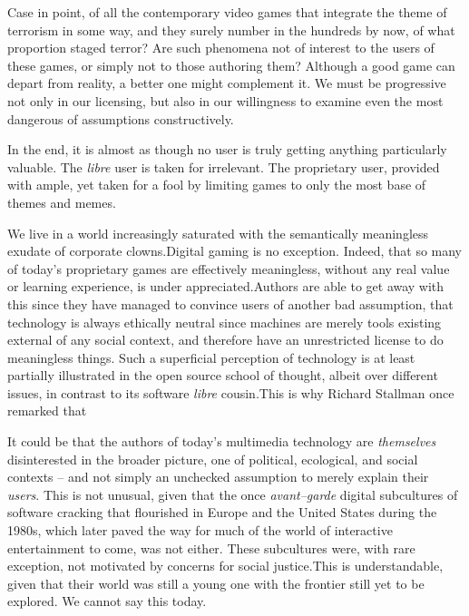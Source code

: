 Case in point, of all the contemporary video games that integrate the theme of terrorism in some way, and they surely number in the hundreds by now, of what proportion staged terror? Are such phenomena not of interest to the users of these games, or simply not to those authoring them? Although a good game can depart from reality, a better one might complement it. We must be progressive not only in our licensing, but also in our willingness to examine even the most dangerous of assumptions constructively. 

In the end, it is almost as though no user is truly getting anything particularly valuable. The {\it libre} user is taken for irrelevant. The proprietary user, provided with ample, yet taken for a fool by limiting games to only the most base of themes and memes.

We live in a world increasingly saturated with the semantically meaningless exudate of corporate clowns. Digital gaming is no exception. Indeed, that so many of today's proprietary games are effectively meaningless, without any real value or learning experience, is under appreciated. Authors are able to get away with this since they have managed to convince users of another bad assumption, that technology is always ethically neutral since machines are merely tools existing external of any social context, and therefore have an unrestricted license to do meaningless things. Such a superficial perception of technology is at least partially illustrated in the open source school of thought, albeit over different issues, in contrast to its software {\it libre} cousin. This is why Richard Stallman once remarked that \footnotecite[auza2008] 

It could be that the authors of today's multimedia technology are {\it themselves} disinterested in the broader picture, one of political, ecological, and social contexts -- and not simply an unchecked assumption to merely explain their {\it users}. This is not unusual, given that the once {\it avant--garde} digital subcultures of software cracking that flourished in Europe and the United States during the 1980s, which later paved the way for much of the world of interactive entertainment to come, was not either. These subcultures were, with rare exception, not motivated by concerns for social justice.\footnotecite[extras={, p.~18.}][wasiak2012] This is understandable, given that their world was still a young one with the frontier still yet to be explored. We cannot say this today.


